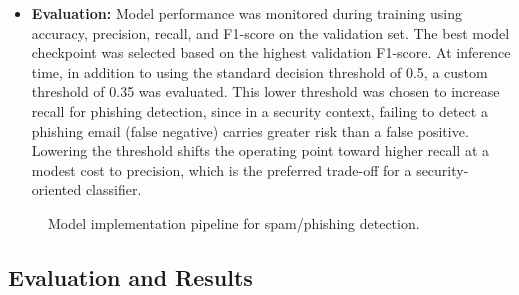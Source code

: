 \begin{itemize}
	\item \textbf{Evaluation:} Model performance was monitored during training using accuracy, precision, recall, and F1-score on the validation set. The best model checkpoint was selected based on the highest validation F1-score. At inference time, in addition to using the standard decision threshold of 0.5, a custom threshold of 0.35 was evaluated. This lower threshold was chosen to increase recall for phishing detection, since in a security context, failing to detect a phishing email (false negative) carries greater risk than a false positive. Lowering the threshold shifts the operating point toward higher recall at a modest cost to precision, which is the preferred trade-off for a security-oriented classifier.
\end{itemize}

\begin{figure}[htbp]
\centering
{}
\caption{Model implementation pipeline for spam/phishing detection.}
\label{fig:spam_model_pipeline}
\end{figure}

\subsection{Evaluation and Results}
\label{sec:spam_evaluation}

